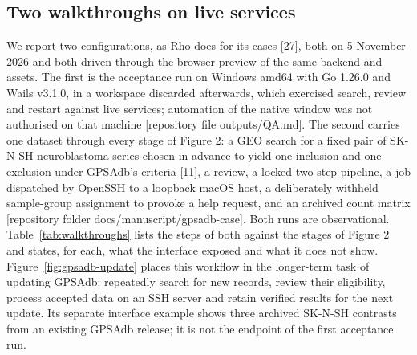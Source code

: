 \documentclass[11pt,a4paper]{article}
\begin{document}
\subsection{Two walkthroughs on live
services}\label{two-walkthroughs-on-live-services}

We report two configurations, as Rho does for its cases {[}27{]}, both
on 5 November 2026 and both driven through the browser preview of the
same backend and assets. The first is the acceptance run on Windows
amd64 with Go 1.26.0 and Wails v3.1.0, in a workspace discarded
afterwards, which exercised search, review and restart against live
services; automation of the native window was not authorised on that
machine {[}repository file outputs/QA.md{]}. The second carries one
dataset through every stage of Figure 2: a GEO search for a fixed pair
of SK-N-SH neuroblastoma series chosen in advance to yield one inclusion
and one exclusion under GPSAdb's criteria {[}11{]}, a review, a locked
two-step pipeline, a job dispatched by OpenSSH to a loopback macOS host,
a deliberately withheld sample-group assignment to provoke a help
request, and an archived count matrix {[}repository folder
docs/manuscript/gpsadb-case{]}. Both runs are observational.
Table~\ref{tab:walkthroughs} lists the steps of both against the stages of
Figure 2 and states, for each, what the interface exposed and what it
does not show. Figure~\ref{fig:gpsadb-update} places this workflow in the
longer-term task of updating GPSAdb: repeatedly search for new records,
review their eligibility, process accepted data on an SSH server and
retain verified results for the next update. Its separate interface
example shows three archived SK-N-SH contrasts from an existing GPSAdb
release; it is not the endpoint of the first acceptance run.
\end{document}
